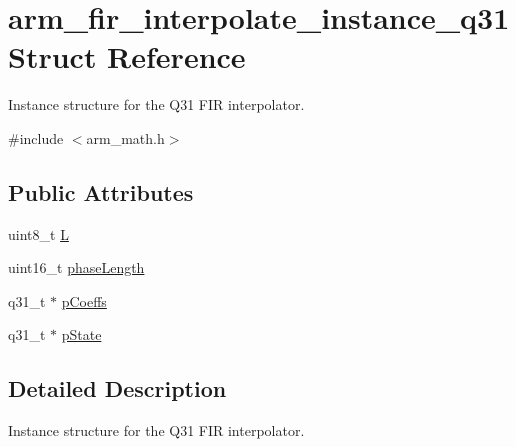 \hypertarget{structarm__fir__interpolate__instance__q31}{\section{arm\-\_\-fir\-\_\-interpolate\-\_\-instance\-\_\-q31 Struct Reference}
\label{structarm__fir__interpolate__instance__q31}
}


Instance structure for the Q31 F\-I\-R interpolator.  




{\ttfamily \#include $<$arm\-\_\-math.\-h$>$}

\subsection*{Public Attributes}
\begin{DoxyCompactItemize}
\item 
uint8\-\_\-t \hyperlink{structarm__fir__interpolate__instance__q31_a5cdf0a631cb74e0e9588c388abe5235c}{L}
\item 
uint16\-\_\-t \hyperlink{structarm__fir__interpolate__instance__q31_a5d243796584afc7cd6c557f00b7acca5}{phase\-Length}
\item 
q31\-\_\-t $\ast$ \hyperlink{structarm__fir__interpolate__instance__q31_afa719433687e1936ec3403d0d32f06e6}{p\-Coeffs}
\item 
q31\-\_\-t $\ast$ \hyperlink{structarm__fir__interpolate__instance__q31_addde04514b6e6ac72be3d609f0398b1a}{p\-State}
\end{DoxyCompactItemize}


\subsection{Detailed Description}
Instance structure for the Q31 F\-I\-R interpolator. 

